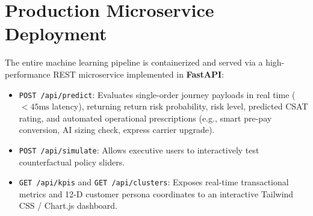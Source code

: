 \documentclass[conference]{IEEEtran}
\begin{document}
\begin{table}[t]
\centering
\caption{ShopSense Enterprise Quad-Goal Optimization Lift}
\label{tab:simulation_results}
\end{table}

\section{Production Microservice Deployment}
The entire machine learning pipeline is containerized and served via a high-performance REST microservice implemented in \textbf{FastAPI}:
\begin{itemize}
    \item \texttt{POST /api/predict}: Evaluates single-order journey payloads in real time ($<45\text{ms}$ latency), returning return risk probability, risk level, predicted CSAT rating, and automated operational prescriptions (e.g., smart pre-pay conversion, AI sizing check, express carrier upgrade).
    \item \texttt{POST /api/simulate}: Allows executive users to interactively test counterfactual policy sliders.
    \item \texttt{GET /api/kpis} and \texttt{GET /api/clusters}: Exposes real-time transactional metrics and 12-D customer persona coordinates to an interactive Tailwind CSS / Chart.js dashboard.
\end{itemize}
\end{document}
